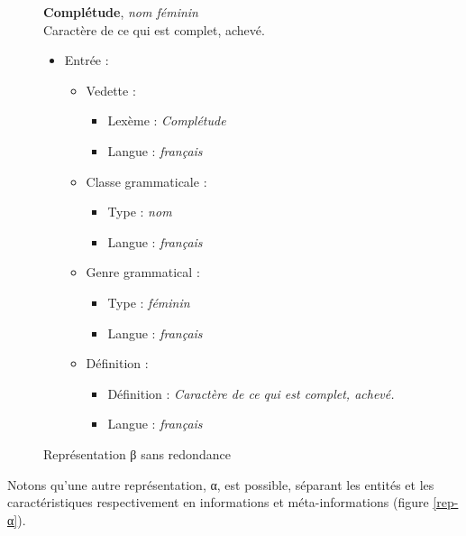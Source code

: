 \documentclass[10pt]{report}
\newcommand{\entité}[1]{\textcolor{blue!80!black}{#1}}
\newcommand{\caractéristique}[1]{\textcolor{green!60!black}{#1}}
\begin{document}
\begin{figure}[H]
	\centering
	\begin{minipage}{0.3\linewidth}
    \textbf{Complétude}, \textit{nom féminin}\\    
    Caractère de ce qui est complet, achevé.
	\end{minipage}%
	\begin{minipage}{0.5\linewidth}
    \begin{itemize}
    	\item \entité{Entrée} :
    	\begin{itemize}
        \item \entité{Vedette} :
        \begin{itemize}
        	\item \caractéristique{Lexème} : \textit{Complétude}
        	\item \caractéristique{Langue} : \textit{français}
        \end{itemize}
        \item \entité{Classe grammaticale} :
        \begin{itemize}
        	\item \caractéristique{Type} : \textit{nom}
        	\item \caractéristique{Langue} : \textit{français}
        \end{itemize}
        \item \entité{Genre grammatical} :
        \begin{itemize}
        	\item \caractéristique{Type} : \textit{féminin}
        	\item \caractéristique{Langue} : \textit{français}
        \end{itemize}
        \item \entité{Définition} :
        \begin{itemize}
        	\item \caractéristique{Définition} : \textit{Caractère de ce qui est complet, achevé.}
        	\item \caractéristique{Langue} : \textit{français}
        \end{itemize}
    	\end{itemize}
    \end{itemize}
	\end{minipage}
	\caption{Représentation β sans redondance}
	\label{rep-β-non-red}
\end{figure}

Notons qu’une autre représentation, α, est possible, séparant les entités et les caractéristiques respectivement en informations et méta-informations (figure \ref{rep-α}).
\end{document}
